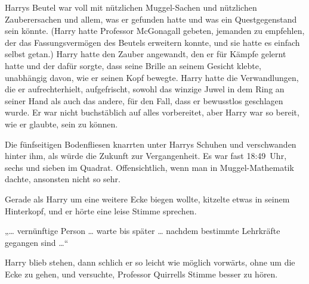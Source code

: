 Harrys Beutel war voll mit nützlichen Muggel-Sachen und nützlichen Zauberersachen und allem, was er gefunden hatte und was ein Questgegenstand sein könnte. (Harry hatte Professor McGonagall gebeten, jemanden zu empfehlen, der das Fassungsvermögen des Beutels erweitern konnte, und sie hatte es einfach selbst getan.) Harry hatte den Zauber angewandt, den er für Kämpfe gelernt hatte und der dafür sorgte, dass seine Brille an seinem Gesicht klebte, unabhängig davon, wie er seinen Kopf bewegte. Harry hatte die Verwandlungen, die er aufrechterhielt, aufgefrischt, sowohl das winzige Juwel in dem Ring an seiner Hand als auch das andere, für den Fall, dass er bewusstlos geschlagen wurde. Er war nicht buchstäblich auf alles vorbereitet, aber Harry war so bereit, wie er glaubte, sein zu können.

Die fünfseitigen Bodenfliesen knarrten unter Harrys Schuhen und verschwanden hinter ihm, als würde die Zukunft zur Vergangenheit. Es war fast 18:49~Uhr, sechs und sieben im Quadrat. Offensichtlich, wenn man in Muggel-Mathematik dachte, ansonsten nicht so sehr.

Gerade als Harry um eine weitere Ecke biegen wollte, kitzelte etwas in seinem Hinterkopf, und er hörte eine leise Stimme sprechen.

„… vernünftige Person … warte bis später … nachdem bestimmte Lehrkräfte gegangen sind …“

Harry blieb stehen, dann schlich er so leicht wie möglich vorwärts, ohne um die Ecke zu gehen, und versuchte, Professor Quirrells Stimme besser zu hören.

